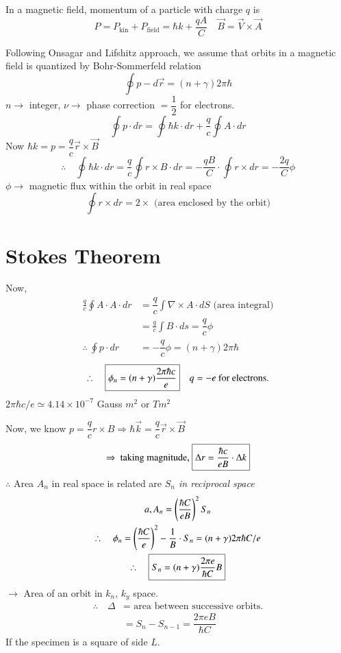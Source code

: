 In a magnetic field, momentum of a particle with charge $q$ is
$$
P=P_{\text{kin}}+P_{\text{field}}=\hbar k+\dfrac{qA}{C}\quad \overrightarrow{B}=\overrightarrow{V}\times \overrightarrow{A}
$$

Following Onsagar and Lifshitz approach, we assume that orbits in a magnetic field is quantized by Bohr-Sommerfeld relation
$$
\oint p-d\overrightarrow{r}=(n+\gamma)2\pi \hbar
$$
$n\to$ integer, $\nu\to$ phase correction $=\dfrac{1}{2}$ for electrons.
$$
\oint p\cdot dr=\oint \hbar k\cdot dr+\dfrac{q}{c}\oint A\cdot dr
$$
Now $\hbar k=p=\dfrac{q}{c}\overrightarrow{r}\times \overrightarrow{B}$
$$
\therefore\quad \oint \hbar k\cdot dr=\dfrac{q}{c}\oint r\times B\cdot dr=-\dfrac{qB}{C}\cdot \oint r\times dr=-\dfrac{2q}{C}\phi
$$
$\phi\to$ magnetic flux within the orbit in real space
$$
\oint r\times dr = 2\times \text{ (area enclosed by the orbit)}
$$

\section*{Stokes Theorem}

Now,
\begin{align*}
\frac{q}{c}\oint A\cdot A\cdot dr &= \dfrac{q}{c}\int \nabla\times A\cdot dS \text{ (area integral)}\\
&= \frac{q}{c}\int B\cdot ds=\dfrac{q}{c}\phi\\
\therefore \ \oint p\cdot dr &= -\dfrac{q}{c}\phi = (n+\gamma)2\pi\hbar
\end{align*}
$$
\therefore\quad \fbox{$\phi_{n}=(n+\gamma)\dfrac{2\pi\hbar c}{e}$}\quad q=-e\text{ for electrons.}
$$
$2\pi\hbar c/e\simeq 4.14\times 10^{-7}$ Gauss $m^{2}$ or $Tm^{2}$

Now, we know  $p=\dfrac{q}{c}r\times B\Rightarrow \hbar\overrightarrow{k}=\dfrac{q}{c}\overrightarrow{r}\times \overrightarrow{B}$
$$
\Rightarrow \text{ taking magnitude, } \fbox{$\Delta r=\dfrac{\hbar c}{eB}\cdot \Delta k$}
$$
$\therefore$ Area $A_{n}$ in real space is related are {\em $S_{n}$ in reciprocal space}
\begin{gather*}
a, A_{n}=\left(\dfrac{\hbar C}{eB}\right)^{2}S_{n}\\
\therefore\quad \phi_{n}=\left(\dfrac{\hbar C}{e}\right)^{2}-\dfrac{1}{B}\cdot S_{n}=(n+\gamma)2\pi \hbar C/e\\
\therefore\quad \fbox{$S_{n}=(n+\gamma)\dfrac{2\pi e}{\hbar C}B$}
\end{gather*}
$\to$ Area of an orbit in $k_{n}$, $k_{y}$ space.
\begin{align*}
\therefore\quad \Delta &=\text{ area between successive orbits.}\\
&= S_{n}-S_{n-1}=\dfrac{2\pi eB}{\hbar C}
\end{align*}
If the specimen is a square of side $L$.

